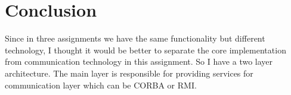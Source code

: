 \documentclass[12pt]{article}
\begin{document}
\section{Conclusion}
Since in three assignments we have the same functionality but different technology, I thought it would be better to separate the core implementation from communication technology in this assignment. So I have a two layer architecture. The main layer is responsible for providing services for communication layer which can be CORBA or RMI.


\end{document}

